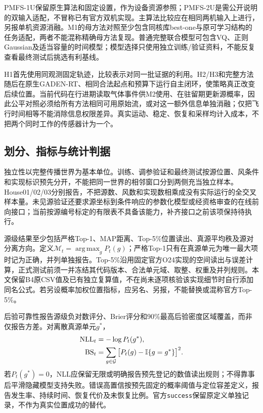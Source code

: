 PMFS-1U保留原生算法和固定设置，作为设备资源参照；PMFS-2U是需公开说明的双输入适配，不冒称已有官方双机实现。主算法比较应在相同两机输入上进行，另报单机资源消融。M1的母方法对照至少包含同核库best-one与原可学习结构的任务适配，两者不能混称精确母方法复现。普通完整联合模型可包含VQ、正则Gaussian及适当容量的时间模型；模型选择只使用独立训练/验证资料，不能反复查看最终测试后挑选有利基线。

H1首先使用同观测固定轨迹，比较表示对同一批证据的利用。H2/H3和完整方法随后在原生GADEN-RT、相同合法起点和预算下运行自主闭环，使策略真正改变后续位置。当前代码在行进期读取气体事件供M2使用、在驻留期更新源概率，因此公平对照必须给所有方法相同可用原始流，或对这一额外信息单独消融；仅把飞行时间相等不能消除信息权限差异。真实运动、稳定、恢复和采样均计入成本，不把两个同时工作的传感器计为一个。

\subsection{划分、指标与统计判据}
独立性以完整传播世界为基本单位。训练、调参验证和最终测试按源位置、风条件和实现标识预先分开，不能把同一世界的相邻窗口分到两侧充当独立样本。House01/02/03分别报告，不把源数、风数和实现数相乘成没有实际运行的全交叉样本量。未见源验证还要求源坐标到条件响应的参数化模型或经资格审查的在线前向接口；当前按源编号标定的有限表不具备该能力，补齐接口之前该项保持待执行。

源级结果至少包括严格Top-1、MAP距离、Top-5\%位置读出、真源平均秩及源对分离方向。定义$\mathcal M_t=\operatorname*{arg\,max}_{g}P_t(g)$；严格Top-1只有在真源单元为唯一最大项时记为正确，并列单独报告。Top-5\%沿用固定官方O24实现的空间读出与误差计算，正式测试前须一并冻结其代码版本、合法单元域、取整、权重及并列规则。本文保留B4原CSV值及已有独立复算值，不在尚未逐项核验该实现细节时自行添加同名公式。若另设概率加权位置指标，应另名、另报，不能替换或混称官方Top-5\%。

后验可靠性报告源级负对数评分、Brier评分和90\%最高后验密度区域覆盖，而非仅报告方差。对离散真源单元$g^*$，
\begin{equation}
 \begin{aligned}
  \mathrm{NLL}_t&=-\log P_t(g^*),\\
  \mathrm{BS}_t&=\sum_{g\in\mathcal G}
      \big[P_t(g)-\mathbb{I}\{g=g^*\}\big]^2.
 \end{aligned}
 \label{eq:evalscores}
\end{equation}
若$P_t(g^*)=0$，NLL应保留无限或明确报告预先登记的数值读出规则；不得靠事后平滑隐藏模型支持失败。错误高置信按预先固定的概率阈值与定位容差定义，报告发生率、持续时间、恢复代价及未恢复比例。官方\texttt{success}保留原定义单独记录，不作为真实位置成功的替代。

